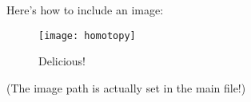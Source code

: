 \documentclass[../main.tex]{subfiles}
\begin{document}
Here's how to include an image:

\begin{figure}[bh]
    \centering
    \texttt{[image: homotopy]}
    \label{fig:img1}
    \caption{Delicious!}
\end{figure}

(The image path is actually set in the main file!)
\end{document}
